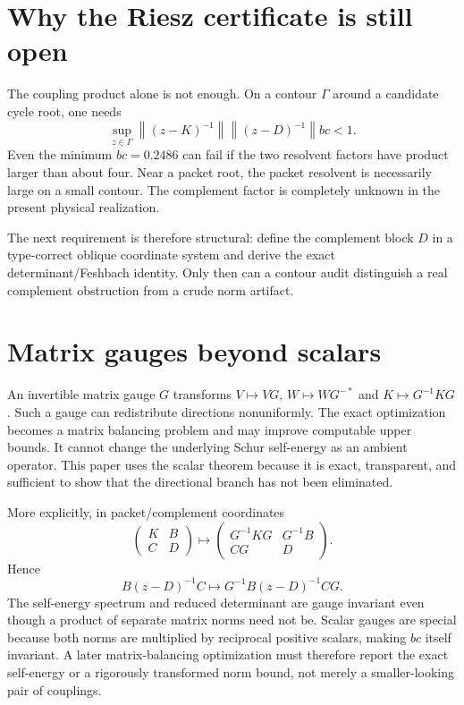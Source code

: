 \documentclass[12pt]{article}
\theoremstyle{remark}
\newcommand{\norm}[1]{\left\lVert#1\right\rVert}
\begin{document}
\section{Why the Riesz certificate is still open}

The coupling product alone is not enough.  On a contour $\Gamma$ around a
candidate cycle root, one needs
\begin{equation}\label{eq:full-gate}
 \sup_{z\in\Gamma}
 \norm{(z-K)^{-1}}
 \norm{(z-D)^{-1}}
 bc<1.
\end{equation}
Even the minimum $bc=0.2486$ can fail if the two resolvent factors have
product larger than about four.  Near a packet root, the packet resolvent is
necessarily large on a small contour.  The complement factor is completely
unknown in the present physical realization.

The next requirement is therefore structural: define the complement block
$D$ in a type-correct oblique coordinate system and derive the exact
determinant/Feshbach identity.  Only then can a contour audit distinguish a
real complement obstruction from a crude norm artifact.

\section{Matrix gauges beyond scalars}

An invertible matrix gauge $G$ transforms
$V\mapsto VG$, $W\mapsto WG^{-*}$ and $K\mapsto G^{-1}KG$.  Such a gauge
can redistribute directions nonuniformly.  The exact optimization becomes a
matrix balancing problem and may improve computable upper bounds.  It cannot
change the underlying Schur self-energy as an ambient operator.  This paper
uses the scalar theorem because it is exact, transparent, and sufficient to
show that the directional branch has not been eliminated.

More explicitly, in packet/complement coordinates
\begin{equation}\label{eq:block-gauge}
 \begin{pmatrix}K&B\\C&D\end{pmatrix}
 \longmapsto
 \begin{pmatrix}G^{-1}KG&G^{-1}B\\CG&D\end{pmatrix}.
\end{equation}
Hence
\begin{equation}\label{eq:self-energy-gauge}
 B(z-D)^{-1}C
 \longmapsto
 G^{-1}B(z-D)^{-1}CG.
\end{equation}
The self-energy spectrum and reduced determinant are gauge invariant even
though a product of separate matrix norms need not be.  Scalar gauges are
special because both norms are multiplied by reciprocal positive scalars,
making $bc$ itself invariant.  A later matrix-balancing optimization must
therefore report the exact self-energy or a rigorously transformed norm
bound, not merely a smaller-looking pair of couplings.
\end{document}
